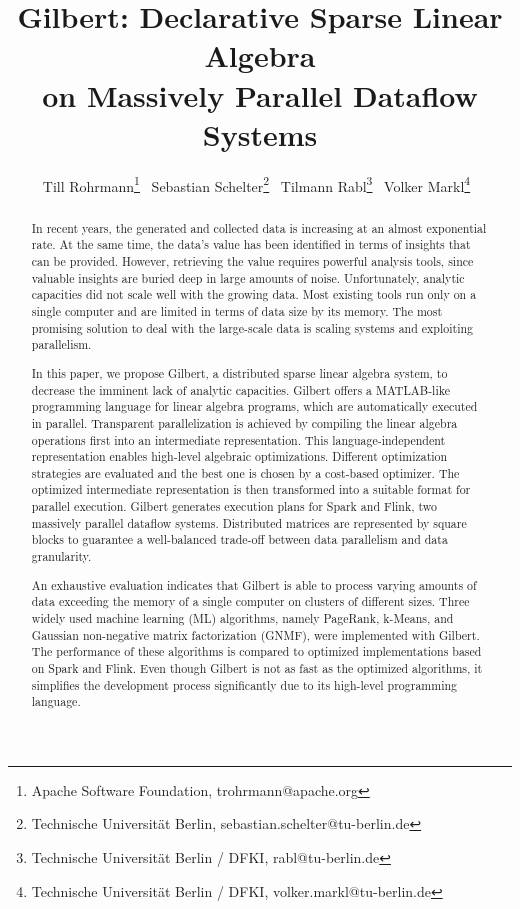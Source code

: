 \documentclass[english]{lni}
\author{
Till Rohrmann\footnote{Apache Software Foundation, trohrmann@apache.org} \, %
Sebastian Schelter\footnote{Technische Universität Berlin, sebastian.schelter@tu-berlin.de} \, %
Tilmann Rabl\footnote{Technische Universität Berlin / DFKI, rabl@tu-berlin.de} \, %
Volker Markl\footnote{Technische Universität Berlin / DFKI, volker.markl@tu-berlin.de} \, %
}
\title{Gilbert: Declarative Sparse Linear Algebra\\ on Massively Parallel Dataflow Systems}
\begin{document}
\maketitle

\thispagestyle{lnifirstpage}
\pagestyle{lni}

\setcounter{footnote}{2}

\begin{abstract}
In recent years, the generated and collected data is increasing at an almost exponential rate. At the same time, the data's value has been identified in terms of insights that can be provided. However, retrieving the value requires powerful analysis tools, since valuable insights are buried deep in large amounts of noise. Unfortunately, analytic capacities did not scale well with the growing data. Most existing tools run only on a single computer and are limited in terms of data size by its memory. The most promising solution to deal with the large-scale data is scaling systems and exploiting parallelism.

In this paper, we propose Gilbert, a distributed sparse linear algebra system, to decrease the imminent lack of analytic capacities. Gilbert offers a MATLAB-like programming language for linear algebra programs, which are automatically executed in parallel. Transparent parallelization is achieved by compiling the linear algebra operations first into an intermediate representation. This language-independent representation enables high-level algebraic optimizations.
Different optimization strategies are evaluated and the best one is chosen by a cost-based optimizer. The optimized intermediate representation is then transformed into a suitable format for parallel execution. Gilbert generates execution plans for Spark and Flink, two massively parallel dataflow systems. Distributed matrices are represented by square blocks to guarantee a well-balanced trade-off between data parallelism and data granularity.

An exhaustive evaluation indicates that Gilbert is able to process varying amounts of data exceeding the memory of a single computer on clusters of different sizes.
Three widely used machine learning (ML) algorithms, namely PageRank, k-Means, and Gaussian non-negative matrix factorization (GNMF), were implemented with Gilbert. The performance of these algorithms is compared to optimized implementations based on Spark and Flink. Even though Gilbert is not as fast as the optimized algorithms, it simplifies the development process significantly due to its high-level programming language.
\end{abstract}
\end{document}
